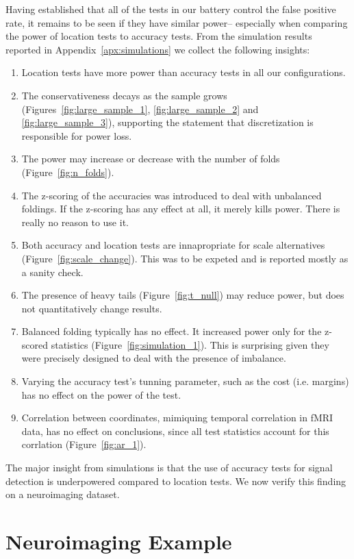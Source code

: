 \documentclass[12pt,a4paper]{article}
\begin{document}
Having established that all of the tests in our battery control the false positive rate, it remains to be seen if they have similar power-- 
especially when comparing the power of location tests to accuracy tests. 
From the simulation results reported in Appendix~\ref{apx:simulations} we collect the following insights:
\begin{enumerate}
\item Location tests have more power than accuracy tests in all our configurations.
\item The conservativeness decays as the sample grows (Figures~\ref{fig:large_sample_1}, \ref{fig:large_sample_2} and \ref{fig:large_sample_3}), supporting the statement that discretization is responsible for power loss. 
\item The power may increase or decrease with the number of folds (Figure~\ref{fig:n_folds}). %
\item The z-scoring of the accuracies was introduced to deal with unbalanced foldings. 
If the z-scoring has any effect at all, it merely kills power.
There is really no reason to use it. 
\item Both accuracy and location tests are innapropriate for scale alternatives (Figure~\ref{fig:scale_change}). 
This was to be expeted and is reported mostly as a sanity check.
\item The presence of heavy tails (Figure~\ref{fig:t_null}) may reduce power, but does not quantitatively change results. 
\item Balanced folding typically has no effect. 
It increased power only for the z-scored statistics (Figure~\ref{fig:simulation_1}). This is surprising given they were precisely designed to deal with the presence of imbalance. 
\item Varying the accuracy test's tunning parameter, such as the cost (i.e. margins) has no effect on the power of the test. 
\item Correlation between coordinates, mimiquing temporal correlation in fMRI data, has no effect on conclusions, since all test statistics account for this corrlation (Figure~\ref{fig:ar_1}). %
\end{enumerate}


The major insight from simulations is that the use of accuracy tests for signal detection is underpowered compared to location tests. 
We now verify this finding on a neuroimaging dataset.



\section{Neuroimaging Example}
\label{sec:example}
\end{document}
